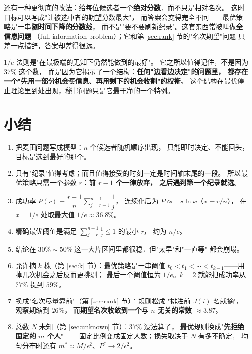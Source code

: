 \documentclass[UTF8,11pt,fontset=macnew]{ctexart}
\begin{document}
还有一种更彻底的改法：给每位候选者一个\textbf{绝对分数}，而不只是相对名次。
这时目标可以写成"让被选中者的期望分数最大"，
而答案会变得完全不同——最优策略是一串\textbf{随时间下降的分数线}，
而不是"要不要刷新纪录"。这套东西常被叫做\textbf{全信息问题}
（full-information problem）；它和第 \ref{sec:rank} 节的"名次期望"问题
只差一点措辞，答案却差得很远。

\begin{keybox}[一句话总结这些变体]
$1/e$ 法则是"在最极端的无知下仍然能做到的最好"。
它之所以值得记住，不是因为 $37\%$ 这个数，
而是因为它揭示了一个结构：\textbf{任何"边看边决定"的问题里，
都存在一个"先用一部分机会买信息、再用剩下的机会收割"的权衡}。
这个结构在最优停止理论里到处出现，秘书问题只是它最干净的一个特例。
\end{keybox}

\section{小结}

\begin{enumerate}
  \item 把麦田问题写成模型：$n$ 个候选者随机顺序出现，
        只能即时决定、不能回头，目标是选到最好的那个。
  \item 只有"纪录"值得考虑；而且值得接受的时刻一定是时间轴末尾的一段。
        所以最优策略只需一个参数 $r$：\textbf{前 $r-1$ 个一律放弃，
        之后遇到第一个纪录就选}。
  \item 成功率
        $P(r)=\dfrac{r-1}{n}\displaystyle\sum_{j=r-1}^{n-1}\dfrac1j$，
        连续化后为 $P\approx -x\ln x$（$x=r/n$），
        在 $x=1/e$ 处取最大值 $1/e\approx36.8\%$。
  \item 精确最优阈值是满足 $\sum_{j=r}^{n-1}\frac1j\le1$ 的最小 $r$，
        约为 $n/e$。
  \item 结论在 $30\%\sim50\%$ 这一大片区间里都很稳，但"太早"和"一直等"
        都会崩塌。
  \item 允许摘 $k$ 株（第 \ref{sec:k} 节）：最优策略是一串阈值
        $t_0<t_1<\cdots<t_{k-1}$——用掉几次机会之后反而更挑剔；
        最后一个阈值恒为 $1/e$。$k=2$ 就能把成功率从 $37\%$ 提到 $59\%$。
  \item 换成"名次尽量靠前"（第 \ref{sec:rank} 节）：规则松成
        "排进前 $J(i)$ 名就摘"，观察期缩到 $26\%$，
        而\textbf{期望名次收敛到一个与 $n$ 无关的常数 $\approx3.87$}。
  \item 总数 $N$ 未知（第 \ref{sec:unknown} 节）：$37\%$ 没法算了，
        最优规则换成"\textbf{先拒绝固定的 $m$ 个人}"——
        固定比例变成固定人数；损失取决于 $N$ 有多不确定，
        均匀分布时还有 $m^*\approx M/e^2$、$P^*\to 2/e^2$。
\end{enumerate}
\end{document}
